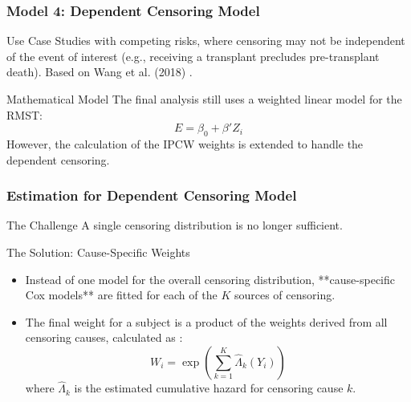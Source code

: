 \documentclass{beamer}
\begin{document}
\begin{frame}
\frametitle{Model 4: Dependent Censoring Model}
\begin{block}{Use Case}
Studies with competing risks, where censoring may not be independent of the event of interest (e.g., receiving a transplant precludes pre-transplant death). Based on Wang et al. (2018) \cite{[1]}.
\end{block}
\begin{block}{Mathematical Model}
The final analysis still uses a weighted linear model for the RMST:
$$E = \beta_0 + \beta' Z_i$$
However, the calculation of the IPCW weights is extended to handle the dependent censoring.
\end{block}
\end{frame}

\begin{frame}
\frametitle{Estimation for Dependent Censoring Model}
\begin{block}{The Challenge}
A single censoring distribution is no longer sufficient.
\end{block}
\begin{block}{The Solution: Cause-Specific Weights}
\begin{itemize}
    \item Instead of one model for the overall censoring distribution, **cause-specific Cox models** are fitted for each of the $K$ sources of censoring.
    \item The final weight for a subject is a product of the weights derived from all censoring causes, calculated as \cite{[1]}:
    $$W_i = \exp\left(\sum_{k=1}^{K} \hat{\Lambda}_{k}(Y_i)\right)$$
    where $\hat{\Lambda}_{k}$ is the estimated cumulative hazard for censoring cause $k$.
\end{itemize}
\end{block}
\end{frame}
\end{document}
